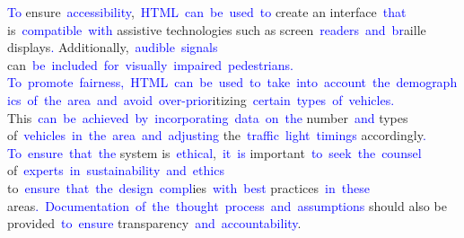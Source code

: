 \documentclass{article}
\begin{document}
\begin{tcolorbox}[colframe=black,colback=white]
{}\textcolor{blue}{To} ensure\textcolor{blue}{~accessibility},\textcolor{blue}{~HTML}\textcolor{blue}{~can}\textcolor{blue}{~be}\textcolor{blue}{~used}\textcolor{blue}{~to} create an interface\textcolor{blue}{~that} is\textcolor{blue}{~compatible}\textcolor{blue}{~with} assistive technologies such as screen\textcolor{blue}{~readers}\textcolor{blue}{~and}\textcolor{blue}{~br}aille displays\textcolor{blue}{.} Additionally,\textcolor{blue}{~audible}\textcolor{blue}{~signals} can\textcolor{blue}{~be}\textcolor{blue}{~included}\textcolor{blue}{~for}\textcolor{blue}{~visually}\textcolor{blue}{~impaired}\textcolor{blue}{~pedestrians}\textcolor{blue}{.
}\textcolor{blue}{To}\textcolor{blue}{~promote}\textcolor{blue}{~fairness}\textcolor{blue}{,}\textcolor{blue}{~HTML}\textcolor{blue}{~can}\textcolor{blue}{~be}\textcolor{blue}{~used}\textcolor{blue}{~to}\textcolor{blue}{~take}\textcolor{blue}{~into}\textcolor{blue}{~account}\textcolor{blue}{~the}\textcolor{blue}{~demographics}\textcolor{blue}{~of}\textcolor{blue}{~the}\textcolor{blue}{~area}\textcolor{blue}{~and}\textcolor{blue}{~avoid}\textcolor{blue}{~over}\textcolor{blue}{-p}\textcolor{blue}{rior}itizing\textcolor{blue}{~certain}\textcolor{blue}{~types}\textcolor{blue}{~of}\textcolor{blue}{~vehicles}\textcolor{blue}{.} This\textcolor{blue}{~can}\textcolor{blue}{~be}\textcolor{blue}{~achieved}\textcolor{blue}{~by}\textcolor{blue}{~incorporating}\textcolor{blue}{~data}\textcolor{blue}{~on}\textcolor{blue}{~the} number\textcolor{blue}{~and} types of\textcolor{blue}{~vehicles}\textcolor{blue}{~in}\textcolor{blue}{~the}\textcolor{blue}{~area}\textcolor{blue}{~and}\textcolor{blue}{~adjusting} the\textcolor{blue}{~traffic}\textcolor{blue}{~light}\textcolor{blue}{~timings} accordingly\textcolor{blue}{.
}\textcolor{blue}{To}\textcolor{blue}{~ensure}\textcolor{blue}{~that}\textcolor{blue}{~the} system is\textcolor{blue}{~ethical},\textcolor{blue}{~it}\textcolor{blue}{~is} important\textcolor{blue}{~to}\textcolor{blue}{~seek}\textcolor{blue}{~the}\textcolor{blue}{~counsel} of\textcolor{blue}{~experts}\textcolor{blue}{~in}\textcolor{blue}{~sustainability}\textcolor{blue}{~and}\textcolor{blue}{~ethics} to\textcolor{blue}{~ensure}\textcolor{blue}{~that}\textcolor{blue}{~the}\textcolor{blue}{~design}\textcolor{blue}{~compl}ies\textcolor{blue}{~with}\textcolor{blue}{~best} practices\textcolor{blue}{~in}\textcolor{blue}{~these} areas\textcolor{blue}{.}\textcolor{blue}{~Documentation}\textcolor{blue}{~of}\textcolor{blue}{~the}\textcolor{blue}{~thought}\textcolor{blue}{~process}\textcolor{blue}{~and}\textcolor{blue}{~assumptions} should also be provided\textcolor{blue}{~to}\textcolor{blue}{~ensure} transparency\textcolor{blue}{~and}\textcolor{blue}{~accountability}.

\end{tcolorbox}
\end{document}
